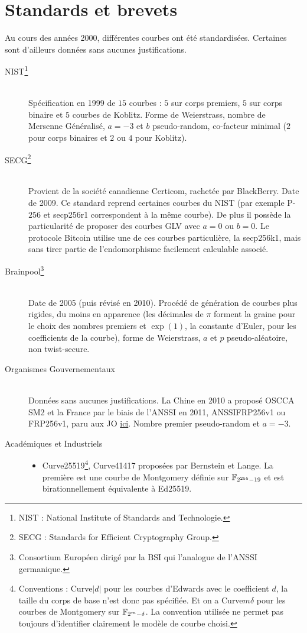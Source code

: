 \section{Standards et brevets}
Au cours des années 2000, différentes courbes ont été standardisées. Certaines sont d'ailleurs données sans aucunes justifications. 
\begin{description}
    \item[NIST\footnote{NIST : National Institute of Standards and Technologie.}] \hfill \\ Spécification en 1999 de $15$ courbes : $5$ sur corps premiers, $5$ sur corps binaire et $5$ courbes de Koblitz. Forme de Weierstrass, nombre de Mersenne Généralisé, $a=-3$ et $b$ pseudo-random, co-facteur minimal ($2$ pour corps binaires et $2$ ou $4$ pour Koblitz).
    \item[SECG\footnote{SECG : Standards for Efficient Cryptography Group.}] \hfill \\
    Provient de la société canadienne Certicom, rachetée par BlackBerry. Date de 2009. Ce standard reprend certaines courbes du NIST (par exemple P-$256$ et secp256r1 correspondent à la même courbe). De plus il possède la particularité de proposer des courbes GLV avec $a = 0$ ou $b = 0$. Le protocole Bitcoin utilise une de ces courbes particulière, la secp256k1, mais sans tirer partie de l'endomorphisme facilement calculable associé.
    \item[Brainpool\footnote{Consortium Européen dirigé par la BSI qui l'analogue de l'ANSSI germanique.}] \hfill \\
    Date de 2005 (puis révisé en 2010). Procédé de génération de courbes plus rigides, du moins en apparence (les décimales de $\pi$ forment la graine pour le choix des nombres premiers et $\exp(1)$, la constante d'Euler, pour les coefficients de la courbe), forme de Weierstrass, $a$ et $p$ pseudo-aléatoire, non twist-secure.
    \item[Organismes Gouvernementaux] \hfill \\
    Données sans aucunes justifications. La Chine en 2010 a proposé OSCCA SM2 et la France par le biais de l'ANSSI en 2011, ANSSIFRP256v1 ou FRP256v1, paru aux JO \href{http://www.legifrance.gouv.fr/affichTexte.do;jsessionid=?cidTexte=JORFTEXT000024668816&dateTexte=&oldAction=rechJO&categorieLien=id}{ici}. Nombre premier pseudo-random et $a=-3$.
    \item[Académiques et Industriels] \hfill
        \begin{itemize}[label=--]
            \item Curve25519\footnote{Conventions : Curve$|d|$ pour les courbes d'Edwards avec le coefficient $d$, la taille du corps de base n'est donc pas spécifiée. Et on a Curve$m\delta$ pour les courbes de Montgomery sur $\mathbb{F}_{2^m - \delta}$. La convention utilisée ne permet pas toujours d'identifier clairement le modèle de courbe choisi.}, Curve41417 proposées par Bernstein et Lange. La première est une courbe de Montgomery définie sur $\mathbb{F}_{2^{255}-19}$ et est birationnellement équivalente à Ed25519.

\end{itemize}
\end{description}
